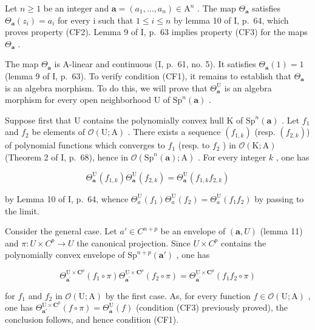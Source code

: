 Let \(n \geqslant 1\) be an integer and \(\boldsymbol{a} = (a_{1}, \ldots, a_{n}) \in \mathrm{A}^{n}\) . The map \(\Theta_{\boldsymbol{a}}\) satisfies \(\Theta_{\boldsymbol{a}}(z_{i}) = a_{i}\) for every i such that \(1 \leqslant i \leqslant n\) by lemma 10 of I, p.~64, which proves property (CF2). Lemma 9 of I, p.~63 implies property (CF3) for the maps \(\Theta_{\boldsymbol{a}}\) .

The map \(\Theta_{\pmb{a}}\) is A-linear and continuous (I, p.~61, no. 5). It satisfies \(\Theta_{\pmb{a}}(1) = 1\) (lemma 9 of I, p.~63). To verify condition (CF1), it remains to establish that \(\Theta_{\pmb{a}}\) is an algebra morphism. To do this, we will prove that \(\Theta_{\pmb{a}}^{\mathrm{U}}\) is an algebra morphism for every open neighborhood U of \(\mathrm{Sp}^{n}(\pmb{a})\) .

Suppose first that U contains the polynomially convex hull K of \(\mathrm{Sp}^{n}(\boldsymbol{a})\) . Let \(f_{1}\) and \(f_{2}\) be elements of \(\mathcal{O}(\mathrm{U};\mathrm{A})\) . There exists a sequence \((f_{1,k})\) (resp. \((f_{2,k})\)) of polynomial functions which converges to \(f_{1}\) (resp. to \(f_{2}\) ) in \(\mathcal{O}(\mathrm{K};\mathrm{A})\) (Theorem 2 of I, p.~68), hence in \(\mathcal{O}(\mathrm{Sp}^{n}(\boldsymbol{a});\mathrm{A})\) . For every integer \(k\) , one has

\[
\Theta_ {\boldsymbol {a}} ^ {\mathrm{U}} (f _ {1, k}) \Theta_ {\boldsymbol {a}} ^ {\mathrm{U}} (f _ {2, k}) = \Theta_ {\boldsymbol {a}} ^ {\mathrm{U}} (f _ {1, k} f _ {2, k})
\]

by Lemma 10 of I, p.~64, whence \(\Theta_{a}^{\mathrm{U}}(f_{1})\Theta_{a}^{\mathrm{U}}(f_{2}) = \Theta_{a}^{\mathrm{U}}(f_{1}f_{2})\) by passing to the limit.

Consider the general case. Let \(a' \in C^{n+p}\) be an envelope of \((\boldsymbol{a}, U)\) (lemma 11) and \(\pi: U \times C^{p} \to U\) the canonical projection. Since \(U \times C^{p}\) contains the polynomially convex envelope of \(\mathrm{Sp}^{n+p}(\boldsymbol{a}')\) , one has

\[
\Theta_ {\boldsymbol {a} ^ {\prime}} ^ {\mathrm{U} \times \mathbf {C} ^ {p}} (f _ {1} \circ \pi) \Theta_ {\boldsymbol {a} ^ {\prime}} ^ {\mathrm{U} \times \mathbf {C} ^ {p}} (f _ {2} \circ \pi) = \Theta_ {\boldsymbol {a} ^ {\prime}} ^ {\mathrm{U} \times \mathbf {C} ^ {p}} (f _ {1} f _ {2} \circ \pi)
\]

for \(f_1\) and \(f_2\) in \(\mathcal{O}(\mathrm{U};\mathrm{A})\) by the first case. As, for every function \(f \in \mathcal{O}(\mathrm{U};\mathrm{A})\) , one has \(\Theta_{\boldsymbol{a}'}^{\mathrm{U}\times \mathbf{C}^p}(f\circ \pi) = \Theta_{\boldsymbol{a}}^{\mathrm{U}}(f)\) (condition (CF3) previously proved), the conclusion follows, and hence condition (CF1).

